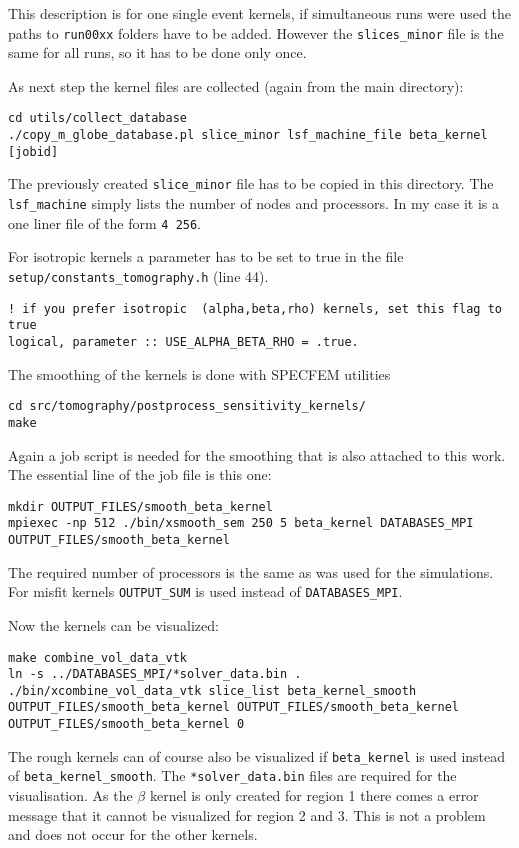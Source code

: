 This description is for one single event kernels, if simultaneous runs were used
the paths to \texttt{run00xx} folders have to be added. 
However the \texttt{slices\_minor} file is the same for all runs, so it has to be 
done only once.

As next step the kernel files are collected (again from the main directory):
\begin{lstlisting} 
cd utils/collect_database
./copy_m_globe_database.pl slice_minor lsf_machine_file beta_kernel [jobid]
\end{lstlisting}

The previously created \texttt{slice\_minor} file has to be copied in this
directory. The \texttt{lsf\_machine} simply lists the number of nodes and processors. In my case it is a one liner file of the form \texttt{4 256}.

For isotropic kernels a parameter has to be set to true in the file 
\texttt{setup/constants\_tomography.h} (line 44).
\begin{lstlisting}
! if you prefer isotropic  (alpha,beta,rho) kernels, set this flag to true
logical, parameter :: USE_ALPHA_BETA_RHO = .true.
\end{lstlisting}

The smoothing of the kernels is done with SPECFEM utilities
\begin{lstlisting} 
cd src/tomography/postprocess_sensitivity_kernels/
make
\end{lstlisting}

Again a job script is needed for the smoothing that is also attached to this work.
The essential line of the job file is this one:
\begin{lstlisting} 
mkdir OUTPUT_FILES/smooth_beta_kernel
mpiexec -np 512 ./bin/xsmooth_sem 250 5 beta_kernel DATABASES_MPI OUTPUT_FILES/smooth_beta_kernel
\end{lstlisting}
The required number of processors is the same as was used for the simulations.
For misfit kernels \texttt{OUTPUT\_SUM} is used instead of \texttt{DATABASES\_MPI}.

Now the kernels can be visualized:
\begin{lstlisting} 
make combine_vol_data_vtk
ln -s ../DATABASES_MPI/*solver_data.bin .
./bin/xcombine_vol_data_vtk slice_list beta_kernel_smooth OUTPUT_FILES/smooth_beta_kernel OUTPUT_FILES/smooth_beta_kernel OUTPUT_FILES/smooth_beta_kernel 0
\end{lstlisting}

The rough kernels can of course also be visualized if 
\texttt{beta\_kernel} is used instead of \texttt{beta\_kernel\_smooth}.
The \texttt{*solver\_data.bin} files are required for the visualisation.
As the $\beta$ kernel is only created for region 1 there comes a error message that 
it cannot be visualized for region 2 and 3. This is not a problem and does not occur
for the other kernels.

